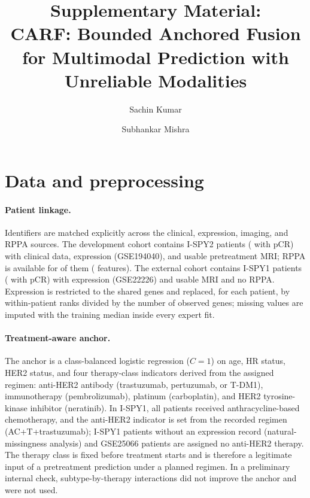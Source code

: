 \documentclass[a4paper,runningheads]{llncs}
\begin{document}
\title{Supplementary Material:\\ CARF: Bounded Anchored Fusion for Multimodal Prediction with Unreliable Modalities}
\author{Sachin Kumar \and
Subhankar Mishra}

\maketitle

\setcounter{section}{0}
\renewcommand{\thesection}{S\arabic{section}}
\renewcommand{\thetable}{S\arabic{table}}
\renewcommand{\thefigure}{S\arabic{figure}}

\section{Data and preprocessing}

\paragraph{Patient linkage.} Identifiers are matched explicitly across the clinical, expression, imaging, and RPPA sources. The development cohort contains \NDev{} I-SPY2 patients (\NDevPos{} with pCR) with clinical data, expression (GSE194040), and usable pretreatment MRI; RPPA \cite{wolf2022ispy} is available for \NRppa{} of them (\NRppaFeat{} features). The external cohort contains \NExt{} I-SPY1 patients (\NExtPos{} with pCR) with expression (GSE22226) and usable MRI and no RPPA. Expression is restricted to the \NGenes{} shared genes and replaced, for each patient, by within-patient ranks divided by the number of observed genes; missing values are imputed with the training median inside every expert fit.

\paragraph{Treatment-aware anchor.} The anchor is a class-balanced logistic regression ($C=1$) on age, HR status, HER2 status, and four therapy-class indicators derived from the assigned regimen: anti-HER2 antibody (trastuzumab, pertuzumab, or T-DM1), immunotherapy (pembrolizumab), platinum (carboplatin), and HER2 tyrosine-kinase inhibitor (neratinib). In I-SPY1, all patients received anthracycline-based chemotherapy, and the anti-HER2 indicator is set from the recorded regimen (AC+T+trastuzumab); I-SPY1 patients without an expression record (natural-missingness analysis) and GSE25066 patients are assigned no anti-HER2 therapy. The therapy class is fixed before treatment starts and is therefore a legitimate input of a pretreatment prediction under a planned regimen. In a preliminary internal check, subtype-by-therapy interactions did not improve the anchor and were not used.
\end{document}
